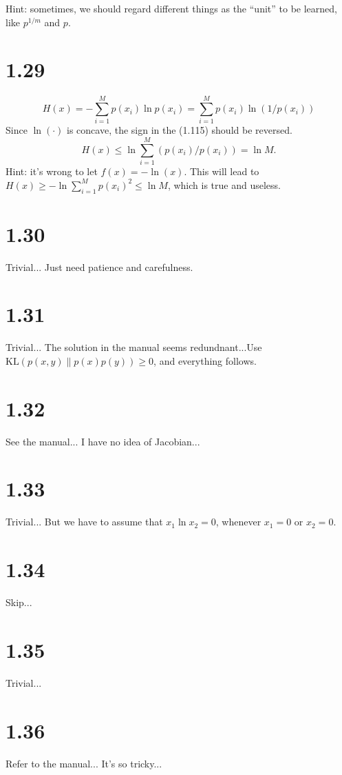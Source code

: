 \documentclass[12pt]{article}
\begin{document}
Hint: sometimes, we should regard different things as the ``unit'' to be learned, like $p^{1/m}$ and $p$.

\section{1.29} %
\begin{equation}
    H(x) = - \sum_{i=1}^{M} p(x_i) \ln p(x_i) = \sum_{i=1}^{M} p(x_i) \ln (1/p(x_i))
\end{equation}
Since $\ln(\cdot)$ is concave, the sign in the (1.115) should be reversed. 
\begin{equation}
    H(x) \leq \ln\sum_{i=1}^M (p(x_i)/p(x_i)) = \ln M.
\end{equation}
Hint: it's wrong to let $f(x)=-\ln(x)$. This will lead to $H(x) \geq -\ln\sum_{i=1}^M p(x_i)^2 \leq \ln M$, which is true and useless.

\section{1.30}
Trivial... Just need patience and carefulness.

\section{1.31}
Trivial... The solution in the manual seems redundnant...Use $\mathrm{KL}(p(x,y) \| p(x)p(y)) \geq 0$, and everything follows.

\section{1.32}
See the manual... I have no idea of Jacobian...

\section{1.33}
Trivial... But we have to assume that $x_1 \ln x_2 = 0 $, whenever $x_1 = 0$ or $x_2 = 0$.

\section{1.34}
Skip...

\section{1.35}
Trivial...


\section{1.36}
Refer to the manual... It's so tricky...
\end{document}
